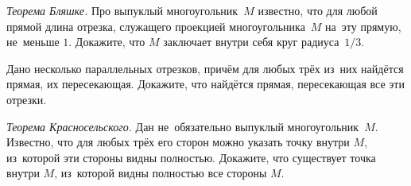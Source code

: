 \begin{problems}


\item
\emph{Теорема Бляшке.}
Про выпуклый многоугольник~$M$ известно, что для любой прямой длина отрезка,
служащего проекцией многоугольника~$M$ на~эту прямую, не~меньше $1$.
Докажите, что $M$ заключает внутри себя круг радиуса~$1/3$.

\item
Дано несколько параллельных отрезков, причём для любых трёх из~них найдётся
прямая, их пересекающая.
Докажите, что найдётся прямая, пересекающая все эти отрезки.

\item
\emph{Теорема Красносельского.}
Дан не~обязательно выпуклый многоугольник~$M$.
Известно, что для любых трёх его сторон можно указать точку внутри $M$,
из~которой эти стороны видны полностью.
Докажите, что существует точка внутри $M$, из~которой видны полностью все
стороны $M$.

\end{problems}

